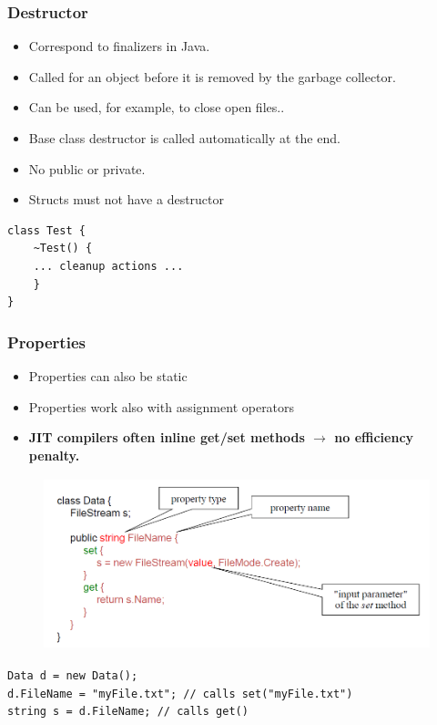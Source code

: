 \subsubsection{Destructor}
\begin{itemize}
	\item Correspond to finalizers in Java.
	\item Called for an object before it is removed by the garbage collector.
	\item Can be used, for example, to close open files..
	\item Base class destructor is called automatically at the end.
	\item No public or private.
	\item Structs must not have a destructor
\end{itemize}
\begin{lstlisting}
class Test {
	~Test() {
	... cleanup actions ...
	}
}
\end{lstlisting}

\subsubsection{Properties}
\begin{itemize}
	\item Properties can also be static
	\item Properties work also with assignment operators
	\item \textbf{JIT compilers often inline get/set methods $\rightarrow$ no efficiency penalty. }
\end{itemize}

\begin{figure}[h]
	\centering
	\includegraphics[height=5cm, ]{images/CSharp/Properties}
\end{figure}

\begin{lstlisting}
Data d = new Data();
d.FileName = "myFile.txt"; // calls set("myFile.txt")
string s = d.FileName; // calls get()
\end{lstlisting}


